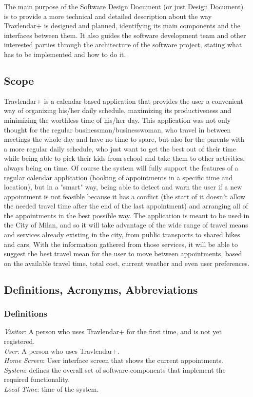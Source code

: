 \documentclass[12pt]{article}
\begin{document}
The main purpose of the Software Design Document (or just Design Document) is to provide a more technical and detailed description about the way Travlendar+ is designed and planned, identifying its main components and the interfaces between them. It also guides the software development team and other interested parties through the architecture of the software project, stating what has to be implemented and how to do it.

\subsection{Scope}
Travlendar+ is a calendar-based application that provides the user a convenient way of organizing his/her daily schedule, maximizing its productiveness and minimizing the worthless time of his/her day. This application was not only thought for the regular businessman/businesswoman, who travel in between meetings the whole day and have no time to spare, but also for the parents with a more regular daily schedule, who just want to get the best out of their time while being able to pick their kids from school and take them to other activities, always being on time.
Of course the system will fully support the features of a regular calendar application (booking of appointments in a specific time and location), but in a "smart" way, being able to detect and warn the user if a new appointment is not feasible because it has a conflict (the start of it doesn't allow the needed travel time after the end of the last appointment) and arranging all of the appointments in the best possible way. The application is meant to be used in the City of Milan, and so it will take advantage of the wide range of travel means and services already existing in the city, from public transports to shared bikes and cars. With the information gathered from those services, it will be able to suggest the best travel mean for the user to move between appointments, based on the available travel time, total cost, current weather and even user preferences.


\subsection{Definitions, Acronyms, Abbreviations}
\subsubsection{Definitions}
\textit{Visitor}: A person who uses Travlendar+ for the first time, and is not yet registered.\\
\textit{User}: A person who uses Travlendar+.\\
\textit{Home Screen}: User interface screen that shows the current appointments.\\
\textit{System}: defines the overall set of software components that implement the required functionality.\\
\textit{Local Time}: time of the system.
\end{document}
